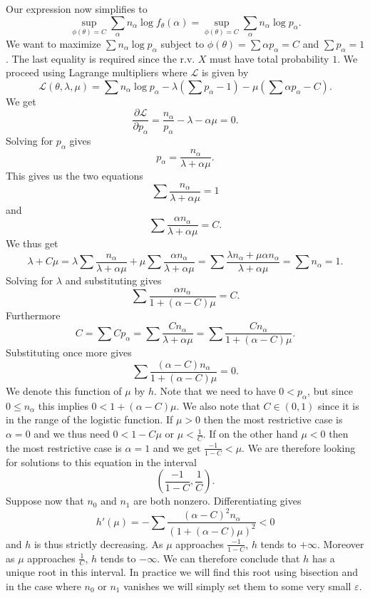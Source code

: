 \documentclass{article}
\begin{document}
Our expression now simplifies to $$\sup_{\phi(\theta)=C}\sum_\alpha n_\alpha\log{f_\theta(\alpha)}=
\sup_{\phi(\theta)=C}\sum_\alpha n_\alpha\log{p_\alpha}.$$ We want to maximize $\sum n_\alpha\log
{p_\alpha}$ subject to $\phi(\theta)=\sum \alpha p_\alpha=C$ and $\sum p_\alpha=1$. The last equality
is required since the r.v. $X$ must have total probability $1$. We proceed using Lagrange multipliers
where $\mathcal{L}$ is given by $$\mathcal{L(\theta,\lambda,\mu)}=\sum n_\alpha \log p_\alpha-\lambda
(\sum p_\alpha -1)-\mu(\sum \alpha p_\alpha-C).$$ We get $$\frac{\partial\mathcal{L}}{\partial p_\alpha}
=\frac{n_\alpha}{p_\alpha}-\lambda-\alpha\mu=0.$$ Solving for $p_\alpha$ gives $$p_\alpha=\frac{n_\alpha}
{\lambda+\alpha\mu}.$$ This gives us the two equations $$\sum \frac{n_\alpha}{\lambda+\alpha\mu}=1$$
and $$\sum \frac{\alpha n_\alpha}{\lambda+\alpha\mu}=C.$$ We thus get $$\lambda+C\mu=\lambda\sum \frac
{n_\alpha}{\lambda+\alpha\mu}+\mu\sum\frac{\alpha n_\alpha}{\lambda+\alpha\mu}=\sum \frac{\lambda n_\alpha
+\mu\alpha n_\alpha}{\lambda+\alpha\mu}=\sum n_\alpha=1.$$ Solving for $\lambda$ and substituting gives
$$\sum \frac{\alpha n_\alpha}{1+(\alpha-C)\mu}=C.$$ Furthermore $$C=\sum C p_\alpha=\sum\frac{C n_\alpha}
{\lambda+\alpha\mu}=\sum\frac{C n_\alpha}{1+(\alpha-C)\mu}.$$ Substituting once more gives $$\sum \frac
{(\alpha-C)n_\alpha}{1+(\alpha-C)\mu}=0.$$ We denote this function of $\mu$ by $h$. Note that we need
to have $0<p_\alpha$, but since $0\leq n_\alpha$ this implies $0<1+(\alpha-C)\mu$. We also note that
$C\in(0,1)$ since it is in the range of the logistic function. If $\mu>0$ then the most restrictive
case is $\alpha=0$ and we thus need $0<1-C\mu$ or $\mu<\frac{1}{C}$. If on the other hand $\mu<0$
then the most restrictive case is $\alpha=1$ and we get $\frac{-1}{1-C}<\mu$. We are therefore looking
for solutions to this equation in the interval $$\left(\frac{-1}{1-C},\frac{1}{C}\right).$$ Suppose
now that $n_0$ and $n_1$ are both nonzero. Differentiating gives $$h'(\mu)=-\sum \frac{(\alpha-C)^2
n_\alpha}{(1+(\alpha-C)\mu)^2}<0$$ and $h$ is thus strictly decreasing. As $\mu$ approaches $\frac{-1}
{1-C}$, $h$ tends to $+\infty$. Moreover as $\mu$ approaches $\frac{1}{C}$, $h$ tends to $-\infty$.
We can therefore conclude that $h$ has a unique root in this interval. In practice we will find this
root using bisection and in the case where $n_0$ or $n_1$ vanishes we will simply set them to some
very small $\varepsilon$.
\end{document}
